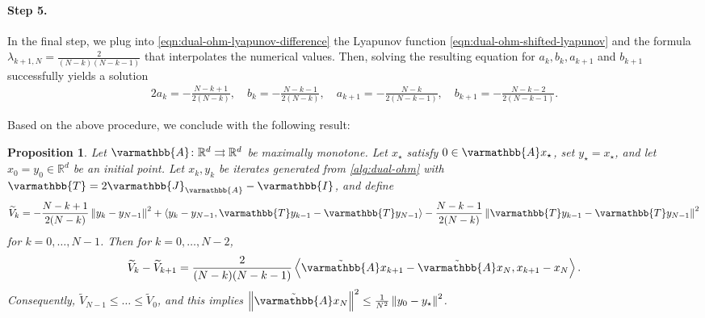 \documentclass{article}
\theoremstyle{definition}
\theoremstyle{plain}
\newtheorem{proposition}{Proposition}
\newcommand{\reals}{\mathbb{R}}
\newcommand{\opA}{{\varmathbb{A}}}
\newcommand{\opI}{{\varmathbb{I}}}
\newcommand{\opJ}{{\varmathbb{J}}}
\newcommand{\opT}{{\varmathbb{T}}}
\newcommand{\inprod}[2]{\left\langle #1,#2 \right\rangle}
\newcommand{\sqnorm}[1]{\left\| #1 \right\|^2}
\newcommand{\topa}{\tilde{\opA}}
\begin{document}
\paragraph{Step 5.}
In the final step, we plug into \eqref{eqn:dual-ohm-lyapunov-difference} the Lyapunov function \eqref{eqn:dual-ohm-shifted-lyapunov} and the formula $\lambda_{k+1,N} = \frac{2}{(N-k)(N-k-1)}$ that interpolates the numerical values. 
Then, solving the resulting equation for $a_k, b_k, a_{k+1}$ and $b_{k+1}$ successfully yields a solution
\begin{align*}{2}
    a_k = -\frac{N-k+1}{2(N-k)}, \quad b_k = -\frac{N-k-1}{2(N-k)} , \quad  a_{k+1} = -\frac{N-k}{2(N-k-1)}, \quad b_{k+1} = -\frac{N-k-2}{2(N-k-1)} .
\end{align*}

Based on the above procedure, we conclude with the following result:
\begin{proposition}
\label{proposition:dual-ohm}
Let $\opA\colon\reals^d\rightrightarrows\reals^d$ be maximally monotone.
Let $x_\star$ satisfy $0\in\opA x_\star$, set $y_\star=x_\star$, and let $x_0 = y_0 \in \reals^d$ be an initial point.
Let $x_k, y_k$ be iterates generated from \eqref{alg:dual-ohm} with $\opT = 2\opJ_\opA - \opI$, and define
\begin{align*}
    \widetilde{V}_k = -\frac{N-k+1}{2(N-k)} \sqnorm{y_k - y_{N-1}} + \inprod{y_k - y_{N-1}}{\opT y_{k-1} - \opT y_{N-1}} - \frac{N-k-1}{2(N-k)} \sqnorm{\opT y_{k-1} - \opT y_{N-1}}
\end{align*}
for $k=0,\dots,N-1$. Then for $k=0,\dots,N-2$,
\begin{align}
\label{eqn:dual-ohm-consecutive-difference-analytic}
    \widetilde{V}_k - \widetilde{V}_{k+1} = \frac{2}{(N-k)(N-k-1)} \inprod{\topa x_{k+1} - \topa x_N}{x_{k+1} - x_N} .
\end{align}
Consequently, $\widetilde{V}_{N-1} \le \dots \le \widetilde{V}_0$, and this implies $\sqnorm{\topa x_N}\le \frac{1}{N^2}\sqnorm{y_0-y_\star}$.
\end{proposition}
\end{document}

